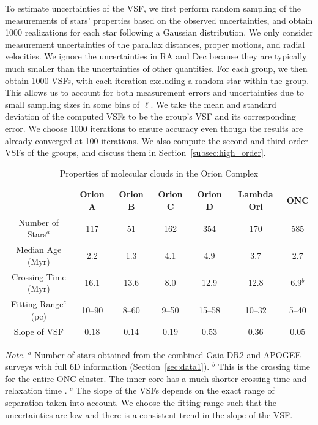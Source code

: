 To estimate uncertainties of the VSF, we first perform random sampling of the measurements of stars' properties based on the observed uncertainties, and obtain 1000 realizations for each star following a Gaussian distribution. We only consider measurement uncertainties of the parallax distances, proper motions, and radial velocities. We ignore the uncertainties in RA and Dec because they are typically much smaller than the uncertainties of other quantities. For each group, we then obtain 1000 VSFs, with each iteration excluding a random star within the group. This allows us to account for both measurement errors and uncertainties due to small sampling sizes in some bins of $\ell$. We take the mean and standard deviation of the computed VSFs to be the group's VSF and its corresponding error. We choose 1000 iterations to ensure accuracy even though the results are already converged at 100 iterations. We also compute the second and third-order VSFs of the groups, and discuss them in Section~\ref{subsec:high_order}.

\begin{table}
    \centering
    \caption{Properties of molecular clouds in the Orion Complex}
    \label{table:data}
    \begin{tabular}{ccccccc}
        \toprule
                              & Orion A   & Orion B  & Orion C  & Orion D   & Lambda Ori & ONC      \\
        \midrule
        Number of Stars$^a$   & 117       & 51       & 162      & 354       & 170        & 585      \\
        Median Age (Myr)      & 2.2       & 1.3      & 4.1      & 4.9       & 3.7        & 2.7      \\
        Crossing Time (Myr)   & 16.1      & 13.6     & 8.0      & 12.9      & 12.8       & 6.9$^b$  \\
        Fitting Range$^c$ (pc)& 10--90  & 8--60  & 9--50  & 15--58  & 10--32   & 5--40  \\
        Slope of VSF          & $0.18$    & $0.14$   & $0.19$   & $0.53$    & $0.36$     & $0.05$   \\
        \bottomrule
    \end{tabular}
    \parbox{\linewidth}{\footnotesize \textit{Note.} $^a$ Number of stars obtained 
    from the combined Gaia DR2 and APOGEE surveys with full 6D information 
    (Section~\ref{sec:data1}). $^b$ This is the crossing time for the entire ONC 
    cluster. The inner core has a much shorter crossing time and relaxation time 
    \citep{hillenbrand_preliminary_1998}. $^c$ The slope of the VSFs depends on the exact range 
    of separation taken into account. We choose the fitting range such that the 
    uncertainties are low and there is a consistent trend in the slope of the VSF.}
\end{table}


